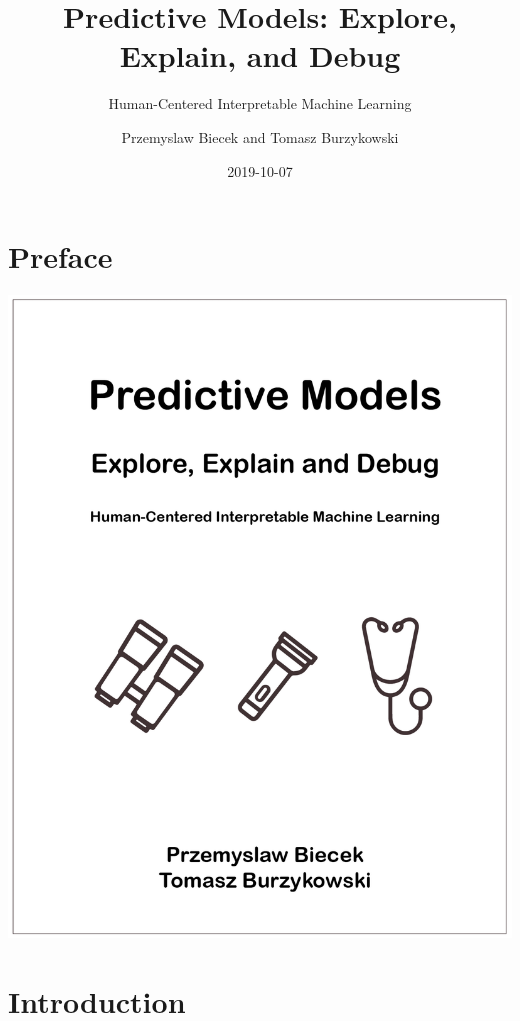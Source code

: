 \documentclass[12pt,]{krantz}
\title{Predictive Models: Explore, Explain, and Debug}
\subtitle{Human-Centered Interpretable Machine Learning}
\author{Przemyslaw Biecek and Tomasz Burzykowski}
\date{2019-10-07}
\begin{document}
\maketitle

{
\hypersetup{linkcolor=black}
\setcounter{tocdepth}{2}
\tableofcontents
}
\listoftables
\listoffigures
\hypertarget{preface}{%
\section*{Preface}\label{preface}}

\begin{center}\includegraphics[width=0.99\linewidth]{figure/front} \end{center}

\hypertarget{introduction}{%
\section{Introduction}\label{introduction}}
\end{document}
